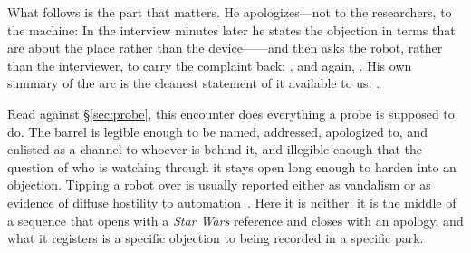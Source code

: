 What follows is the part that matters. He apologizes---not to the researchers, to
the machine:  In the interview minutes later he states the objection in
terms that are about the place rather than the device------and then asks the robot, rather than the interviewer, to carry the
complaint back: , and again,
. His own summary of the arc is the cleanest
statement of it available to us: .

Read against \S\ref{sec:probe}, this encounter does everything a probe is
supposed to do. The barrel is legible enough to be named, addressed, apologized
to, and enlisted as a channel to whoever is behind it, and illegible enough that
the question of who is watching through it stays open long enough to harden into
an objection. Tipping a robot over is usually reported either as vandalism or as
evidence of diffuse hostility to
automation~\cite{brscic2015escaping,salvini2010safe,nomura2016why}. Here it is
neither: it is the middle of a sequence that opens with a \emph{Star Wars}
reference and closes with an apology, and what it registers is a specific
objection to being recorded in a specific park.

